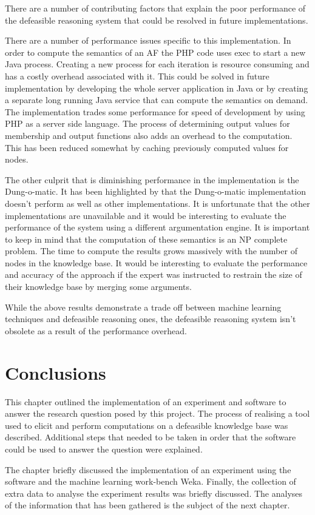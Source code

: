 There are a number of contributing factors that explain the poor performance of the defeasible reasoning system that could be resolved in future implementations. 

There are a number of performance issues specific to this implementation. In order to compute the semantics of an AF the PHP code uses exec to start a new Java process. Creating a new process for each iteration is resource consuming and has a costly overhead associated with it. This could be solved in future implementation by developing the whole server application in Java or by creating a separate long running Java service that can compute the semantics on demand. The implementation trades some performance for speed of development by using PHP as a server side language. The process of determining output values for membership and output functions also adds an overhead to the computation. This has been reduced somewhat by caching previously computed values for nodes. 

The other culprit that is diminishing performance in the implementation is the Dung-o-matic. It has been highlighted by \cite{cerutti2014generating} that the Dung-o-matic implementation doesn't perform as well as other implementations. It is unfortunate that the other implementations are unavailable and it would be interesting to evaluate the performance of the system using a different argumentation engine. It is important to keep in mind that the computation of these semantics is an NP complete problem. The time to compute the results grows massively with the number of nodes in the knowledge base. It would be interesting to evaluate the performance and accuracy of the approach if the expert was instructed to restrain the size of their knowledge base by merging some arguments.

While the above results demonstrate a trade off between machine learning techniques and defeasible reasoning ones, the defeasible reasoning system isn't obsolete as a result of the performance overhead. 

\section{Conclusions}

This chapter outlined the implementation of an experiment and software to answer the research question posed by this project. The process of realising a tool used to elicit and perform computations on a defeasible knowledge base was described. Additional steps that needed to be taken in order that the software could be used to answer the question were explained.

The chapter briefly discussed the implementation of an experiment using the software and the machine learning work-bench Weka. Finally, the collection of extra data to analyse the experiment results was briefly discussed. The analyses of the information that has been gathered is the subject of the next chapter.